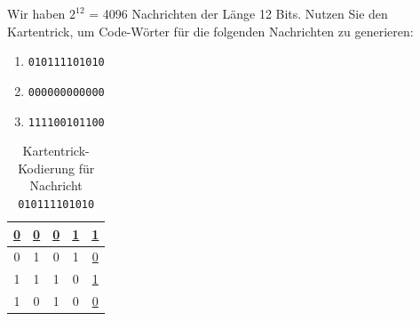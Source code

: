 \begin{myexercise}
Wir haben $2^{12}$ = 4096 Nachrichten der Länge 12 Bits. Nutzen Sie den Kartentrick, um Code-Wörter für die folgenden Nachrichten zu generieren:

\begin{enumerate}
\item \texttt{010111101010}
\item \texttt{000000000000}
\item \texttt{111100101100}
\end{enumerate}

\begin{myanswer}
\begin{table}[H]
    \centering
    \begin{tabular}{c|c|c|c|c}
        \underline{0} & \underline{0} & \underline{0} & \underline{1} & \underline{1} \\ \midrule\midrule
        0 & 1 & 0 & 1 & \underline{0} \\ \midrule
        1 & 1 & 1 & 0 & \underline{1} \\ \midrule
        1 & 0 & 1 & 0 & \underline{0} \\ 
    \end{tabular}
    \caption{Kartentrick-Kodierung für Nachricht \texttt{010111101010}}
    \label{tab:codeword1}
\end{table}
\end{myanswer}
\end{myexercise}

